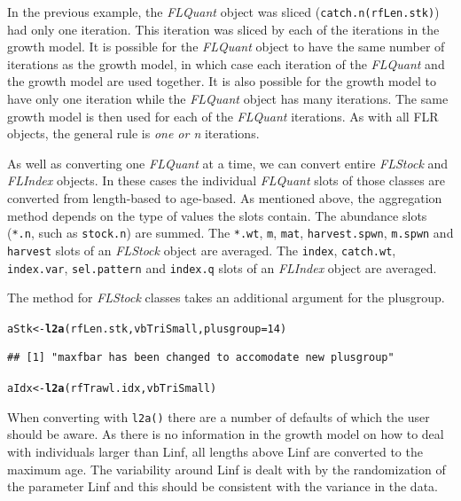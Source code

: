 \documentclass[a4paper,english,10pt]{article}\usepackage[]{graphicx}\usepackage[]{color}
\makeatletter
\newcommand{\hlnum}[1]{\textcolor[rgb]{0.686,0.059,0.569}{#1}}%
\newcommand{\hlstd}[1]{\textcolor[rgb]{0.345,0.345,0.345}{#1}}%
\newcommand{\hlkwb}[1]{\textcolor[rgb]{0.69,0.353,0.396}{#1}}%
\newcommand{\hlkwc}[1]{\textcolor[rgb]{0.333,0.667,0.333}{#1}}%
\newcommand{\hlkwd}[1]{\textcolor[rgb]{0.737,0.353,0.396}{\textbf{#1}}}%
\newenvironment{kframe}{%
 \def\at@end@of@kframe{}%
 \ifinner\ifhmode%
  \def\at@end@of@kframe{\end{minipage}}%
  \begin{minipage}{\columnwidth}%
 \fi\fi%
 \def\FrameCommand##1{\hskip\@totalleftmargin \hskip-\fboxsep
 \colorbox{shadecolor}{##1}\hskip-\fboxsep
     \hskip-\linewidth \hskip-\@totalleftmargin \hskip\columnwidth}%
 \MakeFramed {\advance\hsize-\width
   \@totalleftmargin\z@ \linewidth\hsize
   \@setminipage}}%
 {\par\unskip\endMakeFramed%
 \at@end@of@kframe}
\newenvironment{knitrout}{}{} %
\newcommand{\code}[1]{{\texttt{#1}}}
\newcommand{\class}[1]{{\textit{#1}}}
\makeatother
\begin{document}
In the previous example, the \class{FLQuant} object was sliced (\code{catch.n(rfLen.stk)}) had only one iteration. This iteration was sliced by each of the iterations in the growth model. It is possible for the \class{FLQuant} object to have the same number of iterations as the growth model, in which case each iteration of the \class{FLQuant} and the growth model are used together. It is also possible for the growth model to have only one iteration while the \class{FLQuant} object has many iterations. The same growth model is then used for each of the \class{FLQuant} iterations. As with all FLR objects, the general rule is \emph{one or n} iterations.


As well as converting one \class{FLQuant} at a time, we can convert entire \class{FLStock} and \class{FLIndex} objects. In these cases the individual \class{FLQuant} slots of those classes are converted from length-based to age-based. As mentioned above, the aggregation method depends on the type of values the slots contain. The abundance slots (\code{*.n}, such as \code{stock.n}) are summed. The \code{*.wt}, \code{m}, \code{mat}, \code{harvest.spwn}, \code{m.spwn} and \code{harvest} slots of an \class{FLStock} object are averaged. The \code{index}, \code{catch.wt}, \code{index.var}, \code{sel.pattern} and \code{index.q} slots of an \class{FLIndex} object are averaged.

The method for \class{FLStock} classes takes an additional argument for the plusgroup.

\begin{knitrout}
\color{fgcolor}\begin{kframe}
\begin{alltt}
\hlstd{aStk} \hlkwb{<-} \hlkwd{l2a}\hlstd{(rfLen.stk, vbTriSmall,} \hlkwc{plusgroup} \hlstd{=} \hlnum{14}\hlstd{)}
\end{alltt}
\begin{verbatim}
## [1] "maxfbar has been changed to accomodate new plusgroup"
\end{verbatim}
\begin{alltt}
\hlstd{aIdx} \hlkwb{<-} \hlkwd{l2a}\hlstd{(rfTrawl.idx, vbTriSmall)}
\end{alltt}
\end{kframe}
\end{knitrout}


When converting with \code{l2a()} there are a number of defaults of which the user should be aware. As there is no information in the growth model on how to deal with individuals larger than Linf, all lengths above Linf are converted to the maximum age. The variability around Linf is dealt with by the randomization of the parameter Linf and this should be consistent with the variance in the data.
\end{document}
